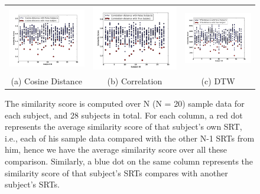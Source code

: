 \begin{figure}[t]
\begin{center}
\begin{tabular}{ccc}
\includegraphics [width=.33\linewidth]{figure/resp_time_cos.png}&
\includegraphics [width=.33\linewidth]{figure/resp_time_cor.png}&
\includegraphics [width=.33\linewidth]{figure/resp_time_dtw.png}\\
(a) Cosine Distance & (b) Correlation & (c) DTW \\
\end{tabular}
\end{center}
\caption{\label{fig:distance} The similarity score is computed over N (N = 20) sample data for each subject, and 28 subjects in total. For each column, a red dot represents the average similarity score of that subject's own SRT, i.e., each of his sample data compared with the other N-1 SRTs from him, hence we have the average similarity score over all these comparison. Similarly, a blue dot on the same column represents the similarity score of that subject's SRTs compares with another subject's SRTs.}
\vspace{-2pt}
\end{figure}


